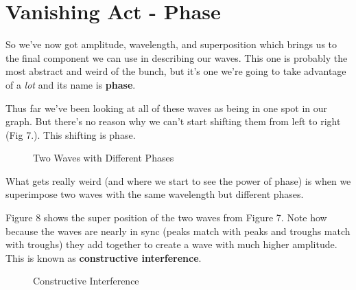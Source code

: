 \documentclass[10pt,a5paper]{book}
\begin{document}
\section{Vanishing Act - Phase}
So we've now got amplitude, wavelength, and superposition which brings us to the final component we can use in describing our waves. This one is probably the most abstract and weird of the bunch, but it's one we're going to take advantage of a \textit{lot} and its name is \textbf{phase}. 

Thus far we've been looking at all of these waves as being in one spot in our graph. But there's no reason why we can't start shifting them from left to right (Fig 7.). This shifting is phase.

\begin{figure}[!htb]
\caption{\label{fig:my-label} Two Waves with Different Phases}
\end{figure}

What gets really weird (and where we start to see the power of phase) is when we superimpose two waves with the same wavelength but different phases. 

Figure 8 shows the super position of the two waves from Figure 7. Note how because the waves are nearly in sync (peaks match with peaks and troughs match with troughs) they add together to create a wave with much higher amplitude. This is known as \textbf{constructive interference}.

\begin{figure}[!htb]
\caption{\label{fig:my-label} Constructive Interference}
\end{figure}
\end{document}
